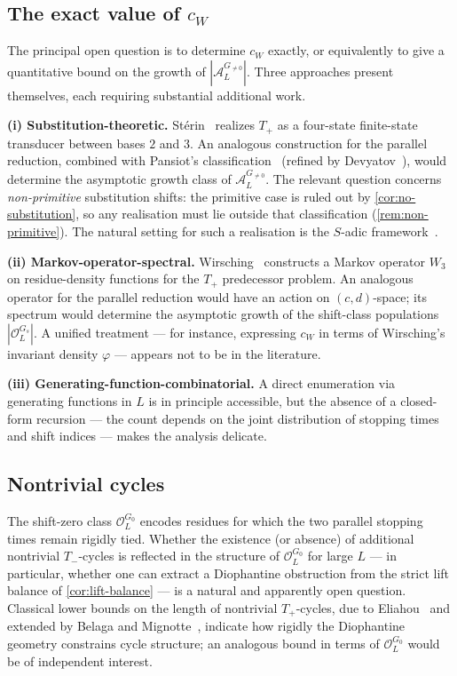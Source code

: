 \documentclass[11pt,reqno]{amsart}
\newcommand{\Tplus}{T_{+}}
\newcommand{\Tminus}{T_{-}}
\newcommand{\Obs}{\mathcal{O}}
\newcommand{\Atom}{\mathcal{A}}
\begin{document}
\subsection{The exact value of \texorpdfstring{$c_W$}{cW}}\label{sec:cW-open}

The principal open question is to determine $c_W$ exactly, or equivalently
to give a quantitative bound on the growth of $|\Atom_L^{G_{\ne 0}}|$. Three
approaches present themselves, each requiring substantial additional work.

\textbf{(i) Substitution-theoretic.} Stérin~\cite{Sterin2020} realizes
$\Tplus$ as a four-state finite-state transducer between bases $2$ and
$3$. An analogous construction for the parallel reduction, combined with
Pansiot's classification~\cite{Pansiot1984} (refined by
Devyatov~\cite{Devyatov2015}), would determine the asymptotic growth
class of $\Atom_L^{G_{\ne 0}}$. The relevant question concerns
\emph{non-primitive} substitution shifts: the primitive case is ruled out
by \cref{cor:no-substitution}, so any realisation must lie
outside that classification (\cref{rem:non-primitive}). The natural
setting for such a realisation is the $S$-adic framework~\cite{BertheDelecroix2014}.

\textbf{(ii) Markov-operator-spectral.} Wirsching~\cite{Wirsching1998}
constructs a Markov operator $W_3$ on residue-density functions for the
$\Tplus$ predecessor problem. An analogous operator for the parallel
reduction would have an action on $(c, d)$-space; its spectrum would
determine the asymptotic growth of the shift-class populations
$|\Obs_L^{G_s}|$. A unified treatment --- for instance, expressing $c_W$
in terms of Wirsching's invariant density $\varphi$ --- appears not to be
in the literature.

\textbf{(iii) Generating-function-combinatorial.} A direct enumeration via
generating functions in $L$ is in principle accessible, but the absence of a
closed-form recursion --- the count depends on the joint distribution of
stopping times and shift indices --- makes the analysis delicate.

\subsection{Nontrivial cycles}

The shift-zero class $\Obs_L^{G_0}$ encodes residues for which the two
parallel stopping times remain rigidly tied. Whether the existence (or
absence) of additional nontrivial $\Tminus$-cycles is reflected in the
structure of $\Obs_L^{G_0}$ for large $L$ --- in particular, whether one
can extract a Diophantine obstruction from the strict lift balance of
\cref{cor:lift-balance} --- is a natural and apparently open
question. Classical lower bounds on the length of nontrivial
$\Tplus$-cycles, due to Eliahou~\cite{Eliahou1993} and extended by
Belaga and Mignotte~\cite{BelagaMignotte2006}, indicate how rigidly the
Diophantine geometry constrains cycle structure; an analogous bound in
terms of $\Obs_L^{G_0}$ would be of independent interest.
\end{document}
